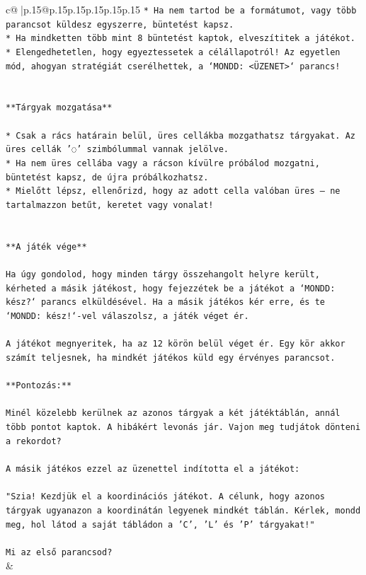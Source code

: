 \documentclass{article}
\begin{document}
{\begin{supertabular}{c@{$\;$}|p{.15\linewidth}@{}p{.15\linewidth}p{.15\linewidth}p{.15\linewidth}p{.15\linewidth}p{.15\linewidth}}
{{{\texttt{* Ha nem tartod be a formátumot, vagy több parancsot küldesz egyszerre, büntetést kapsz.} \\
\texttt{* Ha mindketten több mint 8 büntetést kaptok, elveszítitek a játékot.} \\
\texttt{* Elengedhetetlen, hogy egyeztessetek a célállapotról! Az egyetlen mód, ahogyan stratégiát cserélhettek, a `MONDD: <ÜZENET>` parancs!} \\
\\ 
\\ 
\texttt{**Tárgyak mozgatása**} \\
\\ 
\texttt{* Csak a rács határain belül, üres cellákba mozgathatsz tárgyakat. Az üres cellák '◌' szimbólummal vannak jelölve.} \\
\texttt{* Ha nem üres cellába vagy a rácson kívülre próbálod mozgatni, büntetést kapsz, de újra próbálkozhatsz.} \\
\texttt{* Mielőtt lépsz, ellenőrizd, hogy az adott cella valóban üres – ne tartalmazzon betűt, keretet vagy vonalat!} \\
\\ 
\\ 
\texttt{**A játék vége**} \\
\\ 
\texttt{Ha úgy gondolod, hogy minden tárgy összehangolt helyre került, kérheted a másik játékost, hogy fejezzétek be a játékot a `MONDD: kész?` parancs elküldésével. Ha a másik játékos kér erre, és te `MONDD: kész!`{-}vel válaszolsz, a játék véget ér.} \\
\\ 
\texttt{A játékot megnyeritek, ha az 12 körön belül véget ér. Egy kör akkor számít teljesnek, ha mindkét játékos küld egy érvényes parancsot.} \\
\\ 
\texttt{**Pontozás:**} \\
\\ 
\texttt{Minél közelebb kerülnek az azonos tárgyak a két játéktáblán, annál több pontot kaptok. A hibákért levonás jár. Vajon meg tudjátok dönteni a rekordot?} \\
\\ 
\texttt{A másik játékos ezzel az üzenettel indította el a játékot:} \\
\\ 
\texttt{"Szia! Kezdjük el a koordinációs játékot. A célunk, hogy azonos tárgyak ugyanazon a koordinátán legyenek mindkét táblán. Kérlek, mondd meg, hol látod a saját tábládon a 'C', 'L' és 'P' tárgyakat!"} \\
\\ 
\texttt{Mi az első parancsod?} \\
            }
        }
    }
    & \\ \\


\end{supertabular}}
\end{document}
